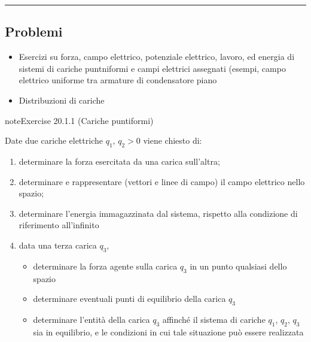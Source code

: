 \documentclass[letterpaper,10pt,italian]{jupyterBook}
\begin{document}
\bigskip\hrule\bigskip


\sphinxstepscope


\subsection{Problemi}
\label{\detokenize{ch/electromagnetism/electrostatics-problems:problemi}}\label{\detokenize{ch/electromagnetism/electrostatics-problems:physics-hs-electromagnetism-electrostatics-problems}}\label{\detokenize{ch/electromagnetism/electrostatics-problems::doc}}\begin{itemize}
\item {} 
\sphinxAtStartPar
Esercizi su forza, campo elettrico, potenziale elettrico, lavoro, ed energia di sistemi di cariche puntniformi e campi elettrici assegnati (esempi, campo elettrico uniforme tra armature di condensatore piano

\item {} 
\sphinxAtStartPar
Distribuzioni di cariche

\end{itemize}
 \label{exercise:ch/electromagnetism/electrostatics-problems-exercise-0}

\begin{sphinxadmonition}{note}{Exercise 20.1.1 (Cariche puntiformi)}



\sphinxAtStartPar
Date due cariche elettriche \(q_1, \, q_2 > 0\) viene chiesto di:
\begin{enumerate}
%
\item {} 
\sphinxAtStartPar
determinare la forza esercitata da una carica sull’altra;

\item {} 
\sphinxAtStartPar
determinare e rappresentare (vettori e linee di campo) il campo elettrico nello spazio;

\item {} 
\sphinxAtStartPar
determinare l’energia immagazzinata dal sistema, rispetto alla condizione di riferimento all’infinito

\item {} 
\sphinxAtStartPar
data una terza carica \(q_3\),
\begin{itemize}
\item {} 
\sphinxAtStartPar
determinare la forza agente sulla carica \(q_3\) in un punto qualsiasi dello spazio

\item {} 
\sphinxAtStartPar
determinare eventuali punti di equilibrio della carica \(q_3\)

\item {} 
\sphinxAtStartPar
determinare l’entità della carica \(q_3\) affinché il sistema di cariche \(q_1\), \(q_2\), \(q_3\) sia in equilibrio, e le condizioni in cui tale situazione può essere realizzata

\end{itemize}

\end{enumerate}
\end{sphinxadmonition}
 \label{exercise:ch/electromagnetism/electrostatics-problems-exercise-1}
\end{document}
